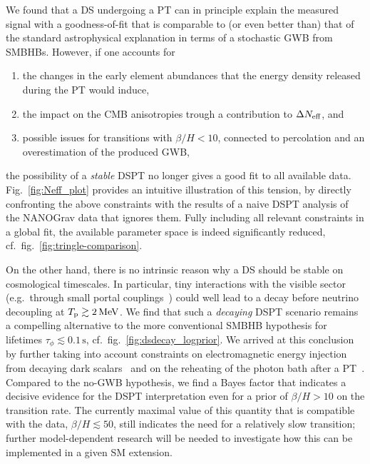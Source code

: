 We found that a  \ac{DS} undergoing a \ac{PT} can in principle explain the measured signal with a goodness-of-fit that is comparable to (or even better than) that of the standard astrophysical explanation in terms of a stochastic \ac{GWB} from \acp{SMBHB}. However, if one accounts for
\begin{enumerate}
	\item the changes in the early element abundances that the energy density released during 
	the \ac{PT} would induce,
	\item the impact on the \ac{CMB} anisotropies trough a contribution to $\Delta N_\text{eff} $, and
	\item possible issues for transitions with $\beta/H< 10$, connected to percolation and an overestimation of the produced \ac{GWB},
\end{enumerate}
the possibility of a \textit{stable} \ac{DSPT} no longer gives a good fit to all available data. Fig.~\ref{fig:Neff_plot} provides an intuitive illustration of this  tension, by directly confronting the above constraints with the results of a naive \ac{DSPT} analysis of the \ac{NANOGrav} data that ignores them. Fully including all relevant constraints in a global fit, the available parameter space is indeed significantly reduced, cf.~fig.~\ref{fig:tringle-comparison}.

On the other hand, there is no intrinsic reason why a \ac{DS} should be stable on cosmological  timescales. In particular, tiny interactions with the visible sector (e.g.~through small portal couplings~\cite{Batell:2009di}) could well lead to a decay before neutrino decoupling at $T_{\text{p}} \gtrsim 2 \, \text{MeV}$. We find that such a \textit{decaying} \ac{DSPT} scenario remains a compelling alternative to the more conventional \ac{SMBHB} hypothesis for lifetimes $\tau_\phi \lesssim 0.1 \, \text{s}$, cf.~fig.~\ref{fig:dsdecay_logprior}. We arrived  at this conclusion by further taking into account constraints on electromagnetic energy injection from decaying dark scalars~\cite{Depta:2020zbh} and on the reheating of the photon bath after a \ac{PT}~\cite{Bai:2021ibt}. Compared to the no-\ac{GWB} hypothesis, we find a Bayes factor that indicates a decisive evidence for the \ac{DSPT} interpretation even for a prior of $\beta/H>10$ on the transition rate. The currently maximal value of this quantity that is compatible with the data, $\beta/H\lesssim50$, still indicates the need for a relatively slow transition; further model-dependent research will be needed to investigate how this can be implemented in a given \ac{SM} extension.

